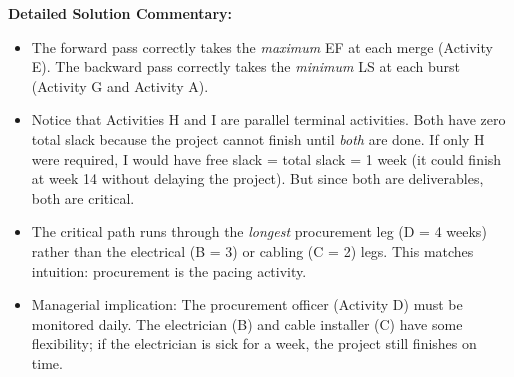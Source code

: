 \documentclass[11pt]{article}
\begin{document}
\begin{exoresolu}
\tcblower
\textbf{Detailed Solution Commentary:}
\begin{itemize}
    \item The forward pass correctly takes the \emph{maximum} EF at each merge (Activity E). The backward pass correctly takes the \emph{minimum} LS at each burst (Activity G and Activity A).
    \item Notice that Activities H and I are parallel terminal activities. Both have zero total slack because the project cannot finish until \emph{both} are done. If only H were required, I would have free slack = total slack = 1 week (it could finish at week 14 without delaying the project). But since both are deliverables, both are critical.
    \item The critical path runs through the \emph{longest} procurement leg (D = 4 weeks) rather than the electrical (B = 3) or cabling (C = 2) legs. This matches intuition: procurement is the pacing activity.
    \item Managerial implication: The procurement officer (Activity D) must be monitored daily. The electrician (B) and cable installer (C) have some flexibility; if the electrician is sick for a week, the project still finishes on time.
\end{itemize}
\end{exoresolu}
\end{document}
